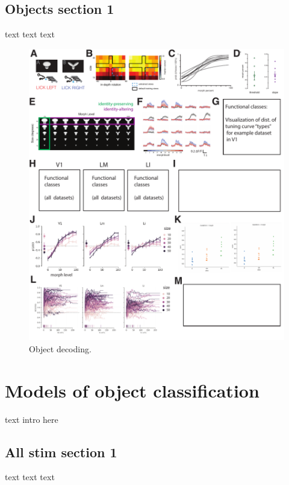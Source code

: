 \documentclass{article}
\begin{document}
\subsection{Objects section 1}
text text text

\begin{figure}[ht]
  \centering
  \includegraphics[width=\textwidth]{figures/objects.pdf}
  \caption{Object decoding.}
  \label{fig:fig4}
\end{figure}

\section{Models of object classification}
text intro here

\subsection{All stim section 1}
text text text
\end{document}
